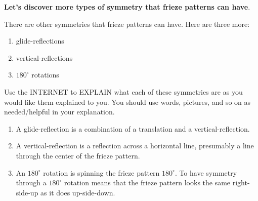 \documentclass[noauthor,nooutcomes,12pt,hints]{ximera}
\begin{document}
\textbf{Let's discover more types of symmetry that
  frieze patterns can have}.



\mynewpage



\begin{question}
  There are other symmetries that frieze patterns can have. Here are
  three more:
  \begin{enumerate}
  \item glide-reflections
  \item vertical-reflections
  \item $180^\circ$ rotations
  \end{enumerate}
  Use the INTERNET to EXPLAIN what each of these symmetries are as you
  would like them explained to you. You should use words, pictures,
  and so on as needed/helpful in your explanation.
  \begin{freeResponse}
    \begin{enumerate}
    \item A glide-reflection is a combination of a translation and a
      vertical-reflection.
    \item A vertical-reflection is a reflection across a horizontal
      line, presumably a line through the center of the frieze
      pattern.
    \item An $180^\circ$ rotation is spinning the frieze pattern
      $180^\circ$. To have symmetry through a $180^\circ$ rotation
      means that the frieze pattern looks the same right-side-up as it
      does up-side-down.
    \end{enumerate}
  \end{freeResponse}
\end{question}
\end{document}
